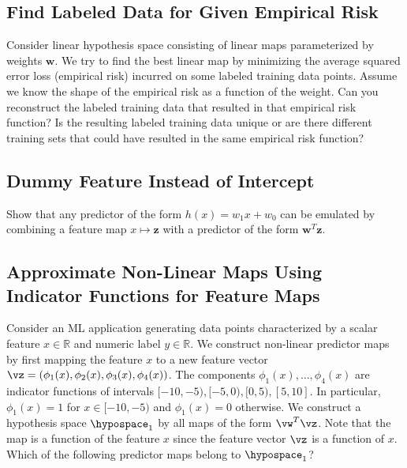 \documentclass[12pt]{report}
\begin{document}
\subsection{Find Labeled Data for Given Empirical Risk} 
\label{ex_2_1}
Consider linear hypothesis space consisting of linear maps parameterized by 
weights $\mathbf{w}$. We try to find the best linear map by minimizing the average 
squared error loss (empirical risk) incurred on some labeled training data points. 
Assume we know the shape of the empirical risk as a function of the weight. 
Can you reconstruct the labeled training data that resulted in that empirical risk 
function? Is the resulting labeled training data unique or are there different training sets 
that could have resulted in the same empirical risk function? 

\subsection{Dummy Feature Instead of Intercept}
\label{sec_dummy_feature}
Show that any predictor of the form $h(x) = w_{1} x +w_{0}$ can be emulated by 
combining a feature map $x \mapsto \mathbf{z}$ with a predictor of the form $\mathbf{w}^{T} \mathbf{z}$. 

\subsection{Approximate Non-Linear Maps Using Indicator Functions for Feature Maps}
\label{ex_2_2}
Consider an ML application generating data points characterized by a scalar feature $x \in \mathbb{R}$ 
and numeric label $y \in \mathbb{R}$. We construct non-linear predictor maps by first mapping the 
feature $x$ to a new feature vector $\vz=(\phi_{1}(x),\phi_{2}(x),\phi_{3}(x),\phi_{4}(x))$. 
The components $\phi_{1}(x),\ldots,\phi_{4}(x)$ are indicator functions of intervals 
$[-10,-5), [-5,0),[0,5),[5,10]$. In particular, $\phi_{1}(x) = 1$ for $x \in [-10,-5)$ and $\phi_{1}(x)=0$ otherwise. 
We construct a hypothesis space $\hypospace_{1}$ by all maps of the form $\vw^{T}\vz$. 
Note that the map is a function of the feature $x$ since the feature vector $\vz$ is a function 
of $x$. Which of the following predictor maps belong to $\hypospace_{1}$?
\end{document}
